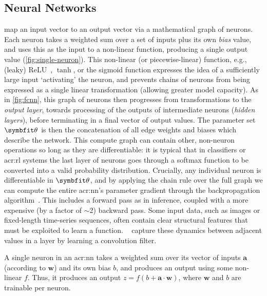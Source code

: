 \subsection{Neural Networks}\label{sec:ddnlit-nns}
 map an input vector to an output vector via a mathematical graph of neurons.
Each neuron takes a weighted sum over a set of inputs plus its own \emph{bias} value, and uses this as the input to a non-linear function, producing a single output value (\cref{fig:single-neuron}).
This non-linear (or piecewise-linear) function, e.g., (leaky) ReLU~\parencite{DBLP:conf/icml/NairH10,leaky-relu}, $\tanh$, or the sigmoid function expresses the idea of a sufficiently large input `activating' the neuron, and prevents chains of neurons from being expressed as a single linear transformation (allowing greater model capacity).
As in \cref{fig:fcnn}, this graph of neurons then progresses from transformations to the \emph{output layer}, towards processing of the outputs of intermediate neurons (\emph{hidden layers}), before terminating in a final vector of output values.
The parameter set $\wvec{}$ is then the concatenation of all edge weights and biases which describe the network.
This compute graph can contain other, non-neuron operations so long as they are differentiable: it is typical that in classifiers or \gls{acr:rl} systems the last layer of neurons goes through a softmax function to be converted into a valid probability distribution.
Crucially, any individual neuron is differentiable in $\wvec{}$, and by applying the chain rule over the full graph we can compute the entire \gls{acr:nn}'s parameter gradient through the backpropagation algorithm~\parencite[pp.~\numrange{197}{217}]{DBLP:books/daglib/0040158}.
This includes a forward pass as in inference, coupled with a more expensive (by a factor of $\sim$\qty{2}{\times}) backward pass.
Some input data, such as images or fixed-length time-series sequences, often contain clear structural features that must be exploited to learn a function.
~\parencite{LeCun89} capture these dynamics between adjacent values in a layer by learning a convolution filter.

\begin{marginfigure}
	\centering
	\resizebox{0.9\linewidth}{!}{}
	\caption[Operation of a single neuron.]{A single neuron in an \gls{acr:nn} takes a weighted sum over its vector of inputs $\mathbf{a}$ (according to $\mathbf{w}$) and its own bias $b$, and produces an output using some non-linear $f$. Thus, it produces an output $z=f(b + \mathbf{a}\cdot\mathbf{w})$, where $\mathbf{w}$ and $b$ are trainable per neuron.}\label{fig:single-neuron}
\end{marginfigure}

